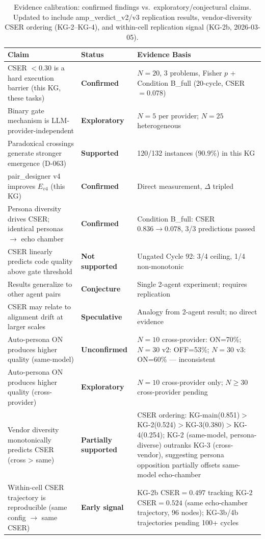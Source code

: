 \documentclass[12pt]{article}
\begin{document}
\begin{table}[h!]\centering\small
\begin{tabular}{p{5.5cm}p{3cm}p{4cm}}
\toprule
Claim & Status & Evidence Basis \\
\midrule
CSER $< 0.30$ is a hard execution barrier (this KG, these tasks) &
\textbf{Confirmed} & $N=20$, 3 problems, Fisher $p$ + Condition B\_full (20-cycle, CSER$=0.078$) \\
Binary gate mechanism is LLM-provider-independent &
\textbf{Exploratory} & $N=5$ per provider; $N=25$ heterogeneous \\
Paradoxical crossings generate stronger emergence (D-063) &
\textbf{Supported} & 120/132 instances ($90.9\%$) in this KG \\
pair\_designer v4 improves $E_{v4}$ (this KG) &
\textbf{Confirmed} & Direct measurement, $\Delta$ tripled \\
Persona diversity drives CSER; identical personas $\to$ echo chamber &
\textbf{Confirmed} & Condition B\_full: CSER $0.836 \to 0.078$, 3/3 predictions passed \\
CSER linearly predicts code quality above gate threshold &
\textbf{Not supported} & Ungated Cycle 92: 3/4 ceiling, 1/4 non-monotonic \\
Results generalize to other agent pairs &
\textbf{Conjecture} & Single 2-agent experiment; requires replication \\
CSER may relate to alignment drift at larger scales &
\textbf{Speculative} & Analogy from 2-agent result; no direct evidence \\
Auto-persona ON produces higher quality (same-model) &
\textbf{Unconfirmed} & $N=10$ cross-provider: ON=70\%; $N=30$ v2: OFF=53\%; $N=30$ v3: ON=60\% --- inconsistent \\
Auto-persona ON produces higher quality (cross-provider) &
\textbf{Exploratory} & $N=10$ cross-provider only; $N\geq30$ cross-provider pending \\
Vendor diversity monotonically predicts CSER (cross > same) &
\textbf{Partially supported} & CSER ordering: KG-main(0.851)$>$KG-2(0.524)$>$KG-3(0.380)$>$KG-4(0.254); KG-2 (same-model, persona-diverse) outranks KG-3 (cross-vendor), suggesting persona opposition partially offsets same-model echo-chamber \\
Within-cell CSER trajectory is reproducible (same config $\to$ same CSER) &
\textbf{Early signal} & KG-2b CSER$=0.497$ tracking KG-2 CSER$=0.524$ (same echo-chamber trajectory, 96 nodes); KG-3b/4b trajectories pending 100+ cycles \\
\bottomrule
\end{tabular}
\caption{Evidence calibration: confirmed findings vs.\ exploratory/conjectural claims.
Updated to include amp\_verdict\_v2/v3 replication results, vendor-diversity CSER ordering (KG-2--KG-4), and within-cell replication signal (KG-2b, 2026-03-05).}
\end{table}
\end{document}
